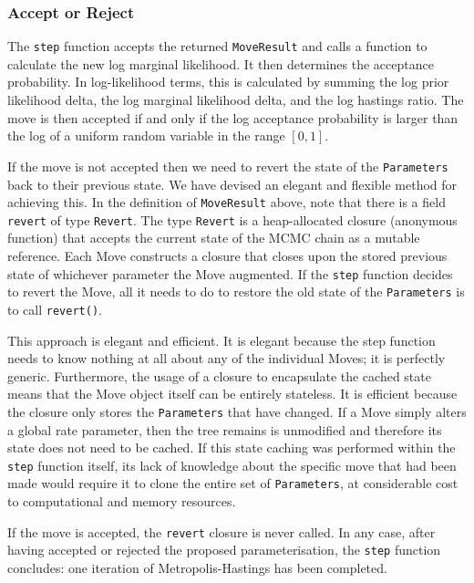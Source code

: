 \documentclass[10pt,journal,compsoc]{IEEEtran}
\begin{document}
\subsubsection{Accept or Reject}

The \texttt{step} function accepts the returned \texttt{MoveResult} and calls a function to calculate the new log marginal likelihood. It then determines the acceptance probability. In log-likelihood terms, this is calculated by summing the log prior likelihood delta, the log marginal likelihood delta, and the log hastings ratio. The move is then accepted if and only if the log acceptance probability is larger than the log of a uniform random variable in the range $[0, 1]$.

If the move is not accepted then we need to revert the state of the \texttt{Parameters} back to their previous state. We have devised an elegant and flexible method for achieving this. In the definition of \texttt{MoveResult} above, note that there is a field \texttt{revert} of type \texttt{Revert}. The type \texttt{Revert} is a heap-allocated closure (anonymous function) that accepts the current state of the MCMC chain as a mutable reference. Each Move constructs a closure that closes upon the stored previous state of whichever parameter the Move augmented. If the \texttt{step} function decides to revert the Move, all it needs to do to restore the old state of the \texttt{Parameters} is to call \texttt{revert()}.

This approach is elegant and efficient. It is elegant because the step function needs to know nothing at all about any of the individual Moves; it is perfectly generic. Furthermore, the usage of a closure to encapsulate the cached state means that the Move object itself can be entirely stateless. It is efficient because the closure only stores the \texttt{Parameters} that have changed. If a Move simply alters a global rate parameter, then the tree remains is unmodified and therefore its state does not need to be cached. If this state caching was performed within the \texttt{step} function itself, its lack of knowledge about the specific move that had been made would require it to clone the entire set of \texttt{Parameters}, at considerable cost to computational and memory resources. 

If the move is accepted, the \texttt{revert} closure is never called. In any case, after having accepted or rejected the proposed parameterisation, the \texttt{step} function concludes: one iteration of Metropolis-Hastings has been completed.
\end{document}
